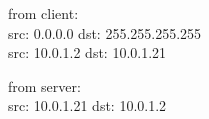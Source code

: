 from client: \\
src: 0.0.0.0 dst: 255.255.255.255 \\
src: 10.0.1.2 dst: 10.0.1.21

from server: \\
src: 10.0.1.21 dst: 10.0.1.2
